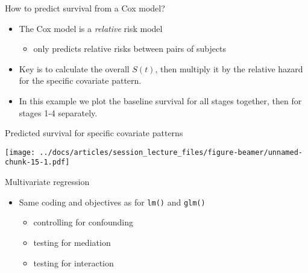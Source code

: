\documentclass[
  ignorenonframetext,
]{beamer}
\providecommand{\tightlist}{%
  \setlength{\itemsep}{0pt}\setlength{\parskip}{0pt}}
\begin{document}
\begin{frame}{How to predict survival from a Cox model?}
\protect\hypertarget{how-to-predict-survival-from-a-cox-model}{}

\begin{itemize}
\tightlist
\item
  The Cox model is a \emph{relative} risk model

  \begin{itemize}
  \tightlist
  \item
    only predicts relative risks between pairs of subjects
  \end{itemize}
\item
  Key is to calculate the overall \(S(t)\), then multiply it by the
  relative hazard for the specific covariate pattern.
\item
  In this example we plot the baseline survival for all stages together,
  then for stages 1-4 separately.
\end{itemize}

\end{frame}

\begin{frame}{Predicted survival for specific covariate patterns}
\protect\hypertarget{predicted-survival-for-specific-covariate-patterns}{}

\texttt{[image: ../docs/articles/session\_lecture\_files/figure-beamer/unnamed-chunk-15-1.pdf]}

\end{frame}

\begin{frame}[fragile]{Multivariate regression}
\protect\hypertarget{multivariate-regression}{}

\begin{itemize}
\tightlist
\item
  Same coding and objectives as for \texttt{lm()} and \texttt{glm()}

  \begin{itemize}
  \tightlist
  \item
    controlling for confounding
  \item
    testing for mediation
  \item
    testing for interaction
  \end{itemize}
\end{itemize}

\end{frame}
\end{document}
